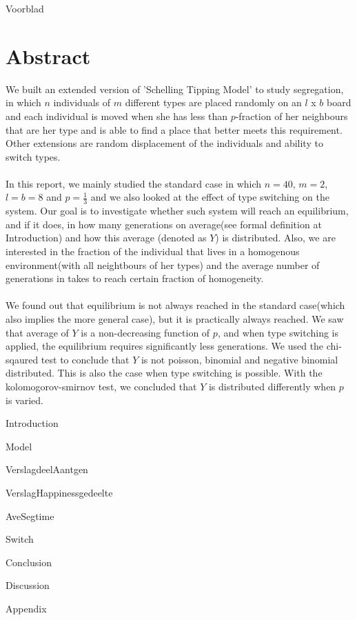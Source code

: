 \documentclass{article}
\begin{document}
{Voorblad}
\newpage


\section*{Abstract}
We built an extended version of 'Schelling Tipping Model' to study segregation, in which $n$ individuals of $m$ different types are placed randomly on an $l$ x $b$ board and each individual is moved when she has less than $p$-fraction of her neighbours that are her type and is able to find a place that better meets this requirement. Other extensions are random displacement of the individuals and ability to switch types.\\
\\
In this report, we mainly studied the standard case in which $n=40$, $m=2$, $l=b=8$ and $p=\frac{1}{3}$ and we also looked at the effect of type switching on the system. Our goal is to investigate whether such system will reach an equilibrium, and if it does, in how many generations on average(see formal definition at Introduction) and how this average (denoted as $Y$) is distributed. Also, we are interested in the fraction of the individual that lives in a homogenous environment(with all neightbours of her types) and the average number of generations in takes to reach certain fraction of homogeneity.\\
\\
We found out that equilibrium is not always reached in the standard case(which also implies the more general case), but it is practically always reached. We saw that average of $Y$ is a non-decreasing function of $p$, and when type switching is applied, the equilibrium requires significantly less generations. We used the chi-sqaured test to conclude that $Y$ is not poisson, binomial and negative binomial distributed. This is also the case when type switching is possible. With the kolomogorov-smirnov test, we concluded that $Y$ is distributed differently when $p$ is varied.


\newpage

\tableofcontents
\newpage

{Introduction}
\newpage

{Model}
\newpage


\newpage

{VerslagdeelAantgen}
\newpage

{VerslagHappinessgedeelte}
\newpage

{AveSegtime}
\newpage

{Switch}
\newpage

{Conclusion}
\newpage

{Discussion}
\newpage

{Appendix}
\end{document}
